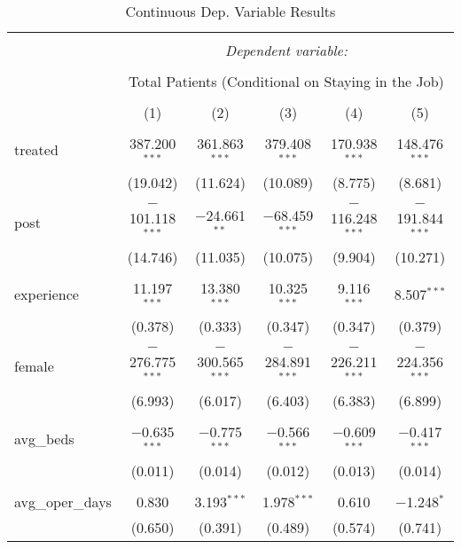 
\begin{table}[!htbp] \centering 
  \caption{Continuous Dep. Variable Results} 
  \label{} 
\begin{tabular}{@{\extracolsep{5pt}}lccccc} 
\\[-1.8ex]\hline 
\hline \\[-1.8ex] 
 & \multicolumn{5}{c}{\textit{Dependent variable:}} \\ 
\cline{2-6} 
\\[-1.8ex] & \multicolumn{5}{c}{Total Patients (Conditional on Staying in the Job)} \\ 
\\[-1.8ex] & (1) & (2) & (3) & (4) & (5)\\ 
\hline \\[-1.8ex] 
 treated & 387.200$^{***}$ & 361.863$^{***}$ & 379.408$^{***}$ & 170.938$^{***}$ & 148.476$^{***}$ \\ 
  & (19.042) & (11.624) & (10.089) & (8.775) & (8.681) \\ 
  & & & & & \\ 
 post & $-$101.118$^{***}$ & $-$24.661$^{**}$ & $-$68.459$^{***}$ & $-$116.248$^{***}$ & $-$191.844$^{***}$ \\ 
  & (14.746) & (11.035) & (10.075) & (9.904) & (10.271) \\ 
  & & & & & \\ 
 experience & 11.197$^{***}$ & 13.380$^{***}$ & 10.325$^{***}$ & 9.116$^{***}$ & 8.507$^{***}$ \\ 
  & (0.378) & (0.333) & (0.347) & (0.347) & (0.379) \\ 
  & & & & & \\ 
 female & $-$276.775$^{***}$ & $-$300.565$^{***}$ & $-$284.891$^{***}$ & $-$226.211$^{***}$ & $-$224.356$^{***}$ \\ 
  & (6.993) & (6.017) & (6.403) & (6.383) & (6.899) \\ 
  & & & & & \\ 
 avg\_beds & $-$0.635$^{***}$ & $-$0.775$^{***}$ & $-$0.566$^{***}$ & $-$0.609$^{***}$ & $-$0.417$^{***}$ \\ 
  & (0.011) & (0.014) & (0.012) & (0.013) & (0.014) \\ 
  & & & & & \\ 
 avg\_oper\_days & 0.830 & 3.193$^{***}$ & 1.978$^{***}$ & 0.610 & $-$1.248$^{*}$ \\ 
  & (0.650) & (0.391) & (0.489) & (0.574) & (0.741) \\ 

\end{tabular}
\end{table}

